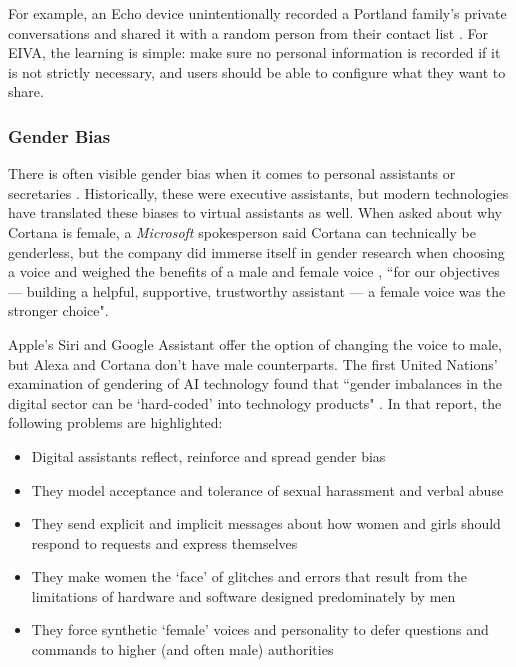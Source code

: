 \documentclass{article}
\begin{document}
For example, an Echo device unintentionally recorded a Portland family's private conversations and shared it with a random person from their contact list \cite{noauthor_this_nodate}. For EIVA, the learning is simple: make sure no personal information is recorded if it is not strictly necessary, and users should be able to configure what they want to share.

\subsubsection{Gender Bias}

There is often visible gender bias when it comes to personal assistants or secretaries \cite{noauthor_why_2018}. Historically, these were executive assistants, but modern technologies have translated these biases to virtual assistants as well. When asked about why Cortana is female, a \emph{Microsoft} spokesperson said Cortana can technically be genderless, but the company did immerse itself in gender research when choosing a voice and weighed the benefits of a male and female voice \cite{pcmag_real_2018}, ``for our objectives — building a helpful, supportive, trustworthy assistant — a female voice was the stronger choice".

Apple's Siri and Google Assistant offer the option of changing the voice to male, but Alexa and Cortana don't have male counterparts. The first United Nations' examination of gendering of AI technology found that ``gender imbalances in the digital sector can be `hard-coded' into technology products" \cite{noauthor_id_nodate}. In that report, the following problems are highlighted:

\begin{itemize}
  \item Digital assistants reflect, reinforce and spread gender bias
  \item They model acceptance and tolerance of sexual harassment and verbal abuse
  \item They send explicit and implicit messages about how women and girls should respond to requests and express themselves
  \item They make women the ‘face’ of glitches and errors that result from the limitations of hardware and software designed predominately by men
  \item They force synthetic ‘female’ voices and personality to defer questions and commands to higher (and often male) authorities
\end{itemize}
\end{document}
